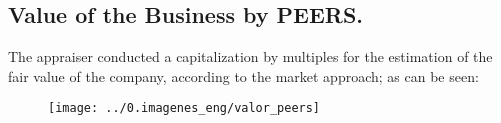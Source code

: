 \subsection{Value of the Business by PEERS.} The appraiser conducted a capitalization by multiples for the estimation of the fair value of the company, according to the market approach; as can be seen:

\begin{figure}[H]
\centering
\texttt{[image: ../0.imagenes\_eng/valor\_peers]}\\

\end{figure}